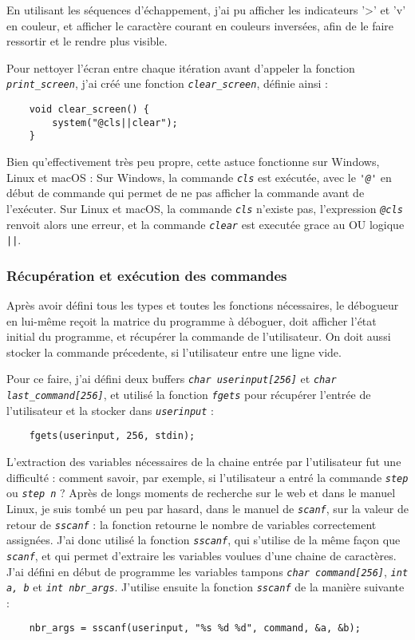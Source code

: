 \documentclass[a4paper,11pt]{article}
\newcommand{\code}[1]{{\itshape\lstinline{#1}}}
\begin{document}
En utilisant les séquences d'échappement, j'ai pu afficher les indicateurs '>' et 'v' en couleur, et afficher le caractère courant en couleurs inversées, afin de le faire ressortir et le rendre plus visible.

\bigskip

Pour nettoyer l'écran entre chaque itération avant d'appeler la fonction \code{print_screen}, j'ai créé une fonction \code{clear_screen}, définie ainsi :
\begin{lstlisting}
    void clear_screen() {
        system("@cls||clear");
    }
\end{lstlisting}
Bien qu'effectivement très peu propre, cette astuce fonctionne sur Windows, Linux et macOS :
Sur Windows, la commande \code{cls} est exécutée, avec le \code{'@'} en début de commande qui permet de ne pas afficher la commande avant de l'exécuter.
Sur Linux et macOS, la commande \code{cls} n'existe pas, l'expression \code{@cls} renvoit alors une erreur, et la commande \code{clear} est executée grace au OU logique \code{||}.

\subsubsection*{Récupération et exécution des commandes}

Après avoir défini tous les types et toutes les fonctions nécessaires, le débogueur en lui-même reçoit la matrice du programme à déboguer, doit afficher l'état initial du programme, et récupérer la commande de l'utilisateur. On doit aussi stocker la commande précedente, si l'utilisateur entre une ligne vide.

Pour ce faire, j'ai défini deux buffers \code{char userinput[256]} et \code{char last_command[256]}, et utilisé la fonction \code{fgets} pour récupérer l'entrée de l'utilisateur et la stocker dans \code{userinput} :
\begin{lstlisting}
    fgets(userinput, 256, stdin);
\end{lstlisting}

L'extraction des variables nécessaires de la chaine entrée par l'utilisateur fut une difficulté : comment savoir, par exemple, si l'utilisateur a entré la commande \code{step} ou \code{step n} ? Après de longs moments de recherche sur le web et dans le manuel Linux, je suis tombé un peu par hasard, dans le manuel de \code{scanf}, sur la valeur de retour de \code{sscanf} : la fonction retourne le nombre de variables correctement assignées.
J'ai donc utilisé la fonction \code{sscanf}, qui s'utilise de la même façon que \code{scanf}, et qui permet d'extraire les variables voulues d'une chaine de caractères. J'ai défini en début de programme les variables tampons \code{char command[256]}, \code{int a, b} et \code{int nbr_args}. J'utilise ensuite la fonction \code{sscanf} de la manière suivante :
{\small\begin{lstlisting}
    nbr_args = sscanf(userinput, "%s %d %d", command, &a, &b);
\end{lstlisting}}
\end{document}
